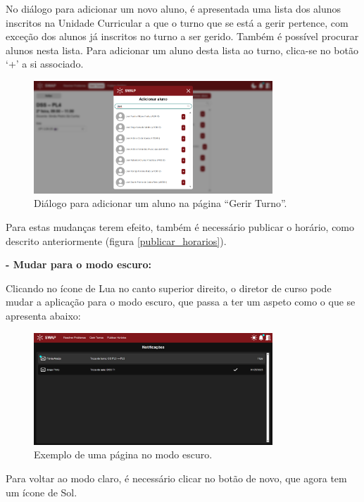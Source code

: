 \documentclass[12pt, a4paper]{article}
\begin{document}
No diálogo para adicionar um novo aluno, é apresentada uma lista dos alunos inscritos na Unidade
Curricular a que o turno que se está a gerir pertence, com exceção dos alunos já inscritos no turno
a ser gerido. Também é possível procurar alunos nesta lista. Para adicionar um aluno desta lista ao
turno, clica-se no botão ‘+’ a si associado.

\begin{figure}[H]
    \centering
    \includegraphics[width=0.8\textwidth]{res/manual/adicionar_aluno.png}
    \caption{Diálogo para adicionar um aluno na página ``Gerir Turno''.}
    \label{adicionar_aluno}
\end{figure}

Para estas mudanças terem efeito, também é necessário publicar o horário, como descrito
anteriormente (figura \ref{publicar_horarios}).

\textbf{- Mudar para o modo escuro:}

Clicando no ícone de Lua no canto superior direito, o diretor de curso pode mudar a aplicação
para o modo escuro, que passa a ter um aspeto como o que se apresenta abaixo:

\begin{figure}[H]
    \centering
    \includegraphics[width=0.8\textwidth]{res/manual/modo_escuro_diretor.png}
    \caption{Exemplo de uma página no modo escuro.}
    \label{modo_escuro_diretor}
\end{figure}

Para voltar ao modo claro, é necessário clicar no botão de novo, que agora tem um ícone de Sol.
\end{document}
